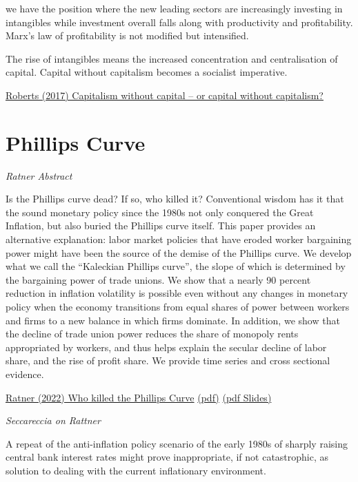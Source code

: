 \documentclass[
]{book}
\begin{document}
we have the position where the new leading sectors are increasingly investing in intangibles while investment overall falls along with productivity and profitability. Marx's law of profitability is not modified but intensified.

The rise of intangibles means the increased concentration and centralisation of capital. Capital without capitalism becomes a socialist imperative.

\href{https://thenextrecession.wordpress.com/2017/12/10/capitalism-without-capital-or-capital-without-capitalism/}{Roberts (2017) Capitalism without capital -- or capital without capitalism?}

\hypertarget{phillips-curve}{%
\chapter{Phillips Curve}\label{phillips-curve}}

\emph{Ratner Abstract}

Is the Phillips curve dead? If so, who killed it? Conventional wisdom has it that the sound monetary policy since the 1980s not only conquered the Great Inflation, but also buried the Phillips curve itself. This paper provides an alternative explanation: labor market policies that have eroded worker bargaining power might have been the source of the demise of the Phillips curve. We develop what we call the ``Kaleckian Phillips curve'', the slope of which is determined by the bargaining power of trade unions. We show that a nearly 90 percent reduction in inflation volatility is possible even without any changes in monetary policy when the economy transitions from equal shares of power between workers and firms to a new balance in which firms dominate. In addition, we show that the decline of trade union power reduces the share of monopoly rents appropriated by workers, and thus helps explain the secular decline of labor share, and the rise of profit share. We provide time series and cross sectional evidence.

\href{https://papers.ssrn.com/sol3/papers.cfm?abstract_id=4118173}{Ratner (2022) Who killed the Phillips Curve}
\href{pdf/Ratner_2019_Who_killed_the_Phillips_Curve.pdf}{(pdf)}
\href{pdf/Ratner_2019_Who_killed_the_Phillips_Curve_Slides.pdf}{(pdf Slides)}

\emph{Seccareccia on Rattner}

A repeat of the anti-inflation policy scenario of the early 1980s of sharply raising central bank interest rates might prove inappropriate, if not catastrophic, as solution to dealing with the current inflationary environment.
\end{document}
